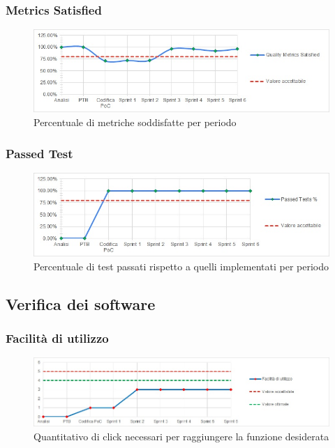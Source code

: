 \subsubsection{Metrics Satisfied}
\begin{figure}[H]
  \centering
  \includegraphics[scale=0.8]{immagini/metriche.jpg}
  \caption{Percentuale di metriche soddisfatte per periodo}
\end{figure}

\subsubsection{Passed Test}
\begin{figure}[H]
  \centering
  \includegraphics[scale=0.8]{immagini/tests.jpg}
  \caption{Percentuale di test passati rispetto a quelli implementati per periodo}
\end{figure}


\subsection{Verifica dei software}\label{subsection:verifica_software}

\subsubsection{Facilità di utilizzo}
\begin{figure}[H]
  \centering
  \includegraphics[scale=0.8]{immagini/facilita_utilizzo.jpg}
  \caption{Quantitativo di click necessari per raggiungere la funzione desiderata}
\end{figure}

